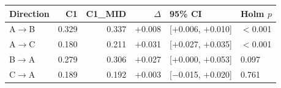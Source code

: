 \begin{tabular}{lrrrll}
\hline
Direction & C1 & C1\_MID & $\Delta$ & 95\% CI & Holm $p$ \\
\hline
A$\to$B & 0.329 & 0.337 & $+$0.008 & [$+$0.006, $+$0.010] & $<$0.001 \\
A$\to$C & 0.180 & 0.211 & $+$0.031 & [$+$0.027, $+$0.035] & $<$0.001 \\
B$\to$A & 0.279 & 0.306 & $+$0.027 & [$+$0.000, $+$0.053] & 0.097 \\
C$\to$A & 0.189 & 0.192 & $+$0.003 & [$-$0.015, $+$0.020] & 0.761 \\
\hline
\end{tabular}
